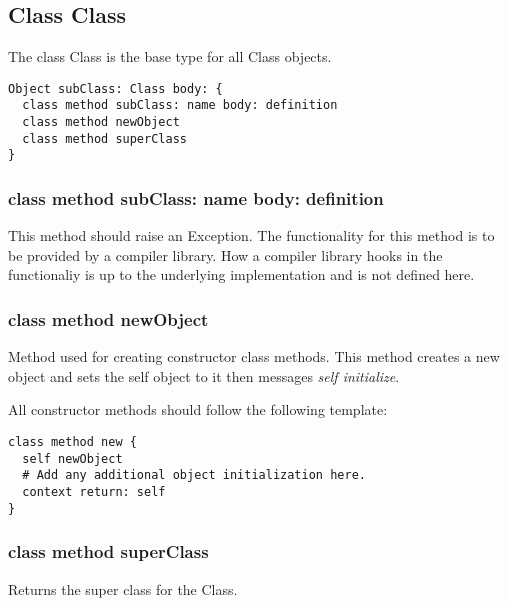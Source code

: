\subsection{Class Class}

The class Class is the base type for all Class objects.

\begin{lstlisting}
Object subClass: Class body: {
  class method subClass: name body: definition
  class method newObject
  class method superClass
}
\end{lstlisting}

\subsubsection{class method subClass: name body: definition}
This method should raise an Exception. The functionality for this method
is to be provided by a compiler library. How a compiler library hooks in the
functionaliy is up to the underlying implementation and is not defined here.

\subsubsection{class method newObject}
\label{sec:class_method_newobject}
Method used for creating constructor class methods. This method creates a new
object and sets the self object to it then messages \textit{self initialize}.

All constructor methods should follow the following template:

\begin{lstlisting}
class method new {
  self newObject
  # Add any additional object initialization here.
  context return: self
}
\end{lstlisting}

\subsubsection{class method superClass}
Returns the super class for the Class.
